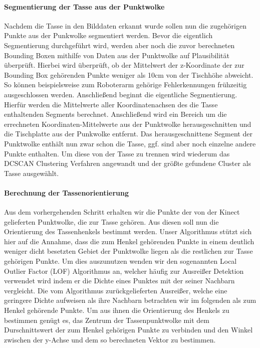\paragraph{Segmentierung der Tasse aus der Punktwolke}
Nachdem die Tasse in den Bilddaten erkannt wurde sollen nun die zugehörigen Punkte aus der Punkwolke segmentiert werden. Bevor die eigentlich Segmentierung durchgeführt wird, werden aber noch die zuvor berechneten Bounding Boxen mithilfe von Daten aus der Punktwolke auf Plausibilität überprüft. Hierbei wird überprüft, ob der Mittelwert der z-Koordinate der zur Bounding Box gehörenden Punkte weniger als 10cm von der Tischhöhe abweicht. So können beispielsweise zum Roboterarm gehörige Fehlerkennungen frühzeitig ausgeschlossen werden. Anschließend beginnt die eigentliche Segmentierung. Hierfür werden die Mittelwerte aller Koordinatenachsen des die Tasse enthaltenden Segments berechnet. Anschließend wird ein Bereich um die errechneten Koordinaten-Mittelwerte aus der Punktwolke herausgeschnitten und die Tischplatte aus der Punkwolke entfernt. Das herausgeschnittene Segment der Punktwolke enthält nun zwar schon die Tasse, ggf. sind aber noch einzelne andere Punkte enthalten. Um diese von der Tasse zu trennen wird wiederum das DCSCAN Clustering Verfahren angewandt und der größte gefundene Cluster als Tasse ausgewählt.

\paragraph{Berechnung der Tassenorientierung}
Aus dem vorhergehenden Schritt erhalten wir die Punkte der von der Kinect gelieferten Punktwolke, die zur Tasse gehören. Aus diesen soll nun die Orientierung des Tassenhenkels bestimmt werden. Unser Algorithmus stützt sich hier auf die Annahme, dass die zum Henkel gehörenden Punkte in einem deutlich weniger dicht besetzten Gebiet der Punktwolke liegen als die restlichen zur Tasse gehörigen Punkte. Um dies auszunutzen wenden wir den sogenannten Local Outlier Factor (LOF) Algorithmus an, welcher häufig zur Ausreißer Detektion verwendet wird indem er  die Dichte eines Punktes mit der seiner Nachbarn vergleicht. Die vom Algorithmus zurückgelieferten Ausreißer, welche eine geringere Dichte aufweisen als ihre Nachbarn betrachten wir im folgenden als zum Henkel gehörende Punkte. Um aus ihnen die Orientierung des Henkels zu bestimmen genügt es, das Zentrum der Tassenpunktwolke mit dem Durschnittswert der zum Henkel gehörigen Punkte zu verbinden und den Winkel zwischen der y-Achse und dem so berechneten Vektor zu bestimmen.